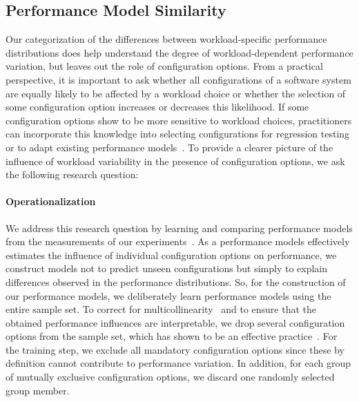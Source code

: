 \subsection{Performance Model Similarity}\label{sec:rq2}
Our categorization of the differences between workload-specific performance distributions does help understand the degree of workload-dependent performance variation, but leaves out the role of configuration options. From a practical perspective, it is important to ask whether all configurations of a software system are equally likely to be affected by a workload choice or whether the selection of some configuration option increases or decreases this likelihood. If some configuration options show to be more sensitive to workload choices, practitioners can incorporate this knowledge into selecting configurations for regression testing or to adapt existing performance models~\cite{jamshidi_learning_2018}. To provide a clearer picture of the influence of workload variability in the presence of configuration options, we ask the following research question:


\paragraph*{Operationalization}
We address this research question by learning and comparing performance models from the measurements of our experiments~\cite{dorn2020,siegmundPerformanceinfluenceModelsHighly2015,haDeepPerf2019,perfAL,guoVariabilityawarePerformancePrediction2013,sarkarCostEfficientSamplingPerformance,guo_2018_data,fourier_learning_2015,perLasso}. As a performance models effectively estimates the influence of individual configuration options on performance, we construct models not to predict unseen configurations but simply to explain differences observed in the performance distributions. So, for the construction of our performance models, we deliberately learn performance models using the entire sample set. 
To correct for multicollinearity~\cite{Daoud_2017} and to ensure that the obtained performance influences are interpretable, we drop several configuration options from the sample set, which has shown to be an effective practice~\cite{dorn2020}. For the training step, we exclude all mandatory configuration options since these by definition cannot contribute to performance variation. In addition, for each group of mutually exclusive configuration options, we discard one randomly selected group member.


